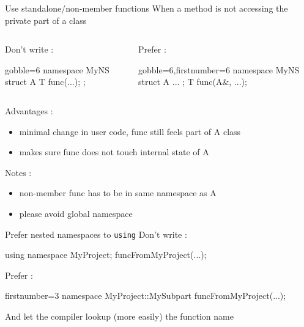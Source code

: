 \begin{frame}[fragile]
  \begin{block}{Use standalone/non-member functions}
    When a method is not accessing the private part of a class
    \vspace{.2cm}
    \begin{columns}
      \begin{column}{.35\textwidth}
        Don't write :
        \begin{cppcode*}{gobble=6}
          namespace MyNS {
            struct A {
              T func(...);
            };
          }
        \end{cppcode*}
      \end{column}
      \begin{column}{.35\textwidth}
        Prefer :
        \begin{cppcode*}{gobble=6,firstnumber=6}
          namespace MyNS {
            struct A { ... };
            T func(A&, ...);
          }
        \end{cppcode*}
        \vfill
      \end{column}
    \end{columns}
    \vspace{.2cm}
    Advantages :
    \begin{itemize}
    \item minimal change in user code, func still feels part of A class
    \item makes sure func does not touch internal state of A
    \end{itemize}
    Notes :
    \begin{itemize}
    \item non-member func has to be in same namespace as A
    \item please avoid global namespace
    \end{itemize}
  \end{block}
\end{frame}

\begin{frame}[fragile]
  \begin{block}{Prefer nested namespaces to \texttt{using}}
    Don't write :
    \begin{cppcode}
      using namespace MyProject;
      funcFromMyProject(...);
    \end{cppcode}
    Prefer :
    \begin{cppcode*}{firstnumber=3}
      namespace MyProject::MySubpart {
        funcFromMyProject(...);
      }
    \end{cppcode*}
    And let the compiler lookup (more easily) the function name
  \end{block}
\end{frame}

